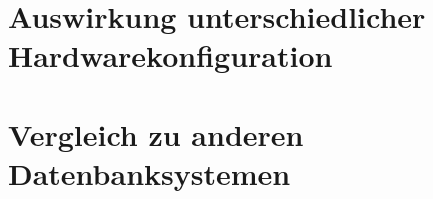 \section{Auswirkung unterschiedlicher Hardwarekonfiguration}\label{auswertung:hardware}


\section{Vergleich zu anderen Datenbanksystemen}\label{auswertung:vergleich}


